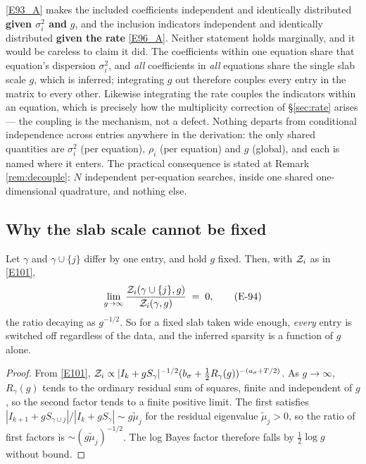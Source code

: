 \begin{remark}\label{rem:iid}
\eqref{E93_A} makes the included coefficients independent and identically distributed
\textbf{given $\sigma_i^2$ and} $g$, and the inclusion indicators independent and
identically distributed \textbf{given the rate} \eqref{E96_A}. Neither statement holds
marginally, and it would be careless to claim it did. The coefficients within one
equation share that equation's dispersion $\sigma_i^2$, and \emph{all} coefficients
in \emph{all} equations share the single slab scale $g$, which is inferred;
integrating $g$ out therefore couples every entry in the matrix to every other.
Likewise integrating the rate couples the indicators within an equation, which is
precisely how the multiplicity correction of \S\ref{sec:rate} arises --- the coupling
is the mechanism, not a defect. Nothing departs from conditional independence across
entries anywhere in the derivation: the only shared quantities are $\sigma_i^2$ (per
equation), $\rho_i$ (per equation) and $g$ (global), and each is named where it
enters. The practical consequence is stated at Remark \ref{rem:decouple}: $N$
independent per-equation searches, inside one shared one-dimensional quadrature, and
nothing else.
\end{remark}

\subsection{Why the slab scale cannot be fixed}\label{sec:slabfixed}

\begin{proposition}\label{prop:lb}
Let $\gamma$ and $\gamma\cup\{j\}$ differ by one entry, and hold $g$ fixed. Then,
with $\mathcal{Z}_i$ as in \eqref{E101},
\begin{equation}
\lim_{g\to\infty}\frac{\mathcal{Z}_i(\gamma\cup\{j\},g)}{\mathcal{Z}_i(\gamma,g)} \;=\; 0,
\tag{E-94}\label{E94}
\end{equation}
the ratio decaying as $g^{-1/2}$.
So for a fixed slab taken wide enough, \emph{every} entry is switched off regardless
of the data, and the inferred sparsity is a function of $g$ alone.
\end{proposition}

\begin{proof}
From \eqref{E101},
$\mathcal{Z}_i\propto|I_k+gS_\gamma|^{-1/2}(b_\sigma+\frac12R_\gamma(g))^{-(a_\sigma+T/2)}$.
As $g\to\infty$, $R_\gamma(g)$ tends to the ordinary residual sum of squares, finite
and independent of $g$, so the second factor tends to a finite positive limit. The
first satisfies $|I_{k+1}+gS_{\gamma\cup j}|/|I_k+gS_\gamma|\sim g\tilde\mu_j$ for
the residual eigenvalue $\tilde\mu_j>0$, so the ratio of first factors is
$\sim(g\tilde\mu_j)^{-1/2}$. The log Bayes factor therefore falls by $\frac12\log g$
without bound.
\end{proof}

